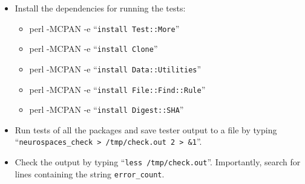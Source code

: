 \documentclass[12pt]{article}
\begin{document}
\begin{itemize}
   \item[] Install the dependencies for running the tests:
      \begin{itemize}
         \item perl -MCPAN -e ``{\tt install Test::More}''
         \item perl -MCPAN -e ``{\tt install Clone}''
         \item perl -MCPAN -e ``{\tt install Data::Utilities}''
         \item perl -MCPAN -e ``{\tt install File::Find::Rule}''
         \item perl -MCPAN -e ``{\tt install Digest::SHA}''
      \end{itemize}
      
   \item[] Run tests of all the packages and save tester output to a file  by typing ``{\tt neurospaces\_check > /tmp/check.out 2 > \&1}''.
   \item[] Check the output by typing ``{\tt less /tmp/check.out}''. Importantly, search for lines containing the string {\tt error\_count}.
\end{itemize}
    
\end{document}
